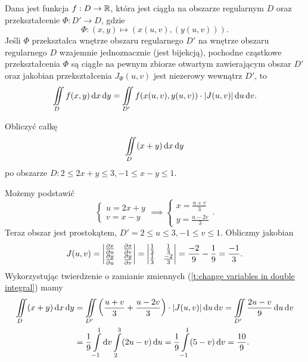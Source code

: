 \begin{theorem}
    \label{t:change variables in double integral}
    Dana jest funkcja $f : D \to \mathbb R$, która jest ciągła na obszarze regularnym $D$ oraz przekształcenie $\varPhi : D' \to D$, gdzie
    \[ \varPhi : (x, y) \mapsto (x(u, v), (y(u, v))). \]
    Jeśli $\varPhi$ przekształca wnętrze obszaru regularnego $D'$ na wnętrze obszaru regularnego $D$ wzajemnie jednoznacznie (jest bijekcją), pochodne cząstkowe przekształcenia $\varPhi$ są ciągłe na pewnym zbiorze otwartym zawierającym obszar $D'$ oraz jakobian przekształcenia $J_\varPhi(u, v)$ jest niezerowy wewnątrz $D'$, to
    \[ \iint\limits_D f(x, y) \operatorname{d}\!{x} \operatorname{d}\!{y} = \iint\limits_{D'} f(x(u, v), y(u, v)) \cdot |J(u, v)| \operatorname{d}\!{u} \operatorname{d}\!{v}. \]
\end{theorem}

\begin{example}
    Obliczyć całkę
    \[ \iint\limits_D (x + y) \operatorname{d}\!{x} \operatorname{d}\!{y} \]
    po obszarze $D : 2 \leq 2x + y \leq 3, -1 \leq x - y \leq 1$.
\end{example}
\begin{solution}
    Możemy podstawić
    \[ \begin{cases} u = 2x + y \\ v = x - y \end{cases} \implies \begin{cases} x = \frac{u + v}{3} \\ y = \frac{u - 2v}{3} \end{cases}. \]
    Teraz obszar jest prostokątem, $D' = 2 \leq u \leq 3, -1 \leq v \leq 1$. Obliczmy jakobian
    \[ J(u, v) = \begin{vmatrix}
        \frac{\p x}{\p u} & \frac{\p x}{\p v} \\
        \frac{\p y}{\p u} & \frac{\p y}{\p v}
    \end{vmatrix} = \begin{vmatrix}
        \frac{1}{3} & \frac{1}{3} \\
        \frac{1}{3} & \frac{-2}{3}
    \end{vmatrix} = \frac{-2}{9} - \frac{1}{9} = \frac{-1}{3}. \]
    Wykorzystując twierdzenie o zamianie zmiennych (\ref{t:change variables in double integral}) mamy
    \begin{align*}
        \iint\limits_D (x + y) \d x \d y &= \iint\limits_{D'} \left(\frac{u + v}{3} + \frac{u - 2v}{3}\right) \cdot |J(u, v)| \d u \d v = \iint\limits_{D'} \frac{2u - v}{9} \d u \d v \\
        &= \frac{1}{9}\int\limits_{-1}^1 \d v \int\limits_2^3 (2u - v) \d u = \frac{1}{9}\int\limits_{-1}^1 (5 - v) \d v = \frac{10}{9}.
    \end{align*}
\end{solution}

